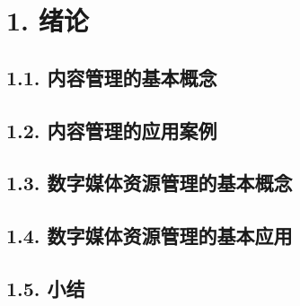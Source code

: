 \section{1. 绪论}\label{ux7eeaux8bba}

\subsection{1.1.
内容管理的基本概念}\label{ux5185ux5bb9ux7ba1ux7406ux7684ux57faux672cux6982ux5ff5}

\subsection{1.2.
内容管理的应用案例}\label{ux5185ux5bb9ux7ba1ux7406ux7684ux5e94ux7528ux6848ux4f8b}

\subsection{1.3.
数字媒体资源管理的基本概念}\label{ux6570ux5b57ux5a92ux4f53ux8d44ux6e90ux7ba1ux7406ux7684ux57faux672cux6982ux5ff5}

\subsection{1.4.
数字媒体资源管理的基本应用}\label{ux6570ux5b57ux5a92ux4f53ux8d44ux6e90ux7ba1ux7406ux7684ux57faux672cux5e94ux7528}

\subsection{1.5. 小结}\label{ux5c0fux7ed3}
